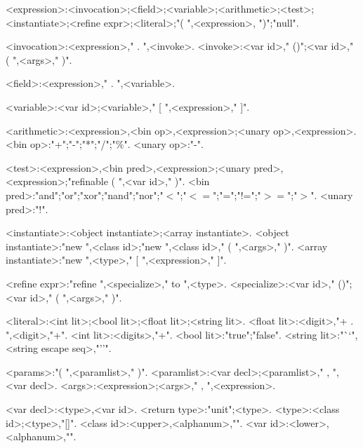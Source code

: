 \begin{grammar}
<expression>:<invocation>;<field>;<variable>;<arithmetic>;<test>;<instantiate>;<refine expr>;<literal>;"( ",<expression>, ")";"null".

<invocation>:<expression>," . ",<invoke>.
<invoke>:<var id>," ()";<var id>," ( ",<args>," )".

<field>:<expression>," . ",<variable>.

<variable>:<var id>;<variable>," [ ",<expression>," ]".

<arithmetic>:<expression>,<bin op>,<expression>;<unary op>,<expression>.
<bin op>:"+";"-";"*";"/";"\%".
<unary op>:"-".

<test>:<expression>,<bin pred>,<expression>;<unary pred>,<expression>;"refinable ( ",<var id>," )".
<bin pred>:"and";"or";"xor";"nand";"nor";"$<$";"$<=$";"=";"!=";"$>=$";"$>$".
<unary pred>:"!".

<instantiate>:<object instantiate>;<array instantiate>.
<object instantiate>:"new ",<class id>;"new ",<class id>," ( ",<args>," )".
<array instantiate>:"new ",<type>," [ ",<expression>," ]".

<refine expr>:"refine ",<specialize>," to ",<type>.
<specialize>:<var id>," ()";<var id>," ( ",<args>," )".

<literal>:<int lit>;<bool lit>;<float lit>;<string lit>.
<float lit>:<digit>,"{\small +} . ",<digit>,"{\small +}".
<int lit>:<digits>,"{\small +}".
<bool lit>:"true";"false".
<string lit>:"``",<string escape seq>,"''".

<params>:"( ",<paramlist>," )".
<paramlist>:<var decl>;<paramlist>," , ",<var decl>.
<args>:<expression>;<args>," , ",<expression>.

<var decl>:<type>,<var id>.
<return type>:"unit";<type>.
<type>:<class id>;<type>,"[]".
<class id>:<upper>,<alphanum>,"{\small *}".
<var id>:<lower>,<alphanum>,"{\small *}".

\end{grammar}
